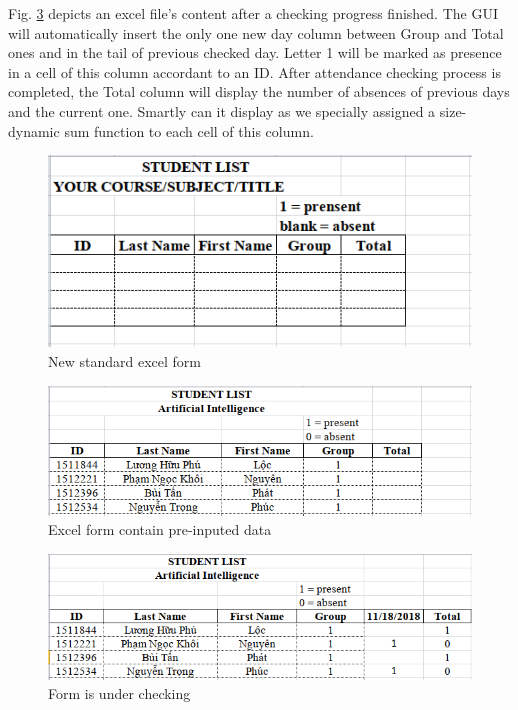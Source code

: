 \documentclass[journal, twocolumn]{IEEEtran}
\begin{document}
Fig. \ref{fig:form-checked} depicts an excel file's content after a checking progress finished. 
The GUI will automatically insert the only one new day column between Group and Total ones and in the tail of previous checked day. 
Letter 1 will be marked as presence in a cell of this column accordant to an ID. 
After attendance checking process is completed, the Total column will display the number of absences of previous days and the current one. Smartly can it display as we specially assigned a size-dynamic sum function to each cell of this column.


\begin{figure}
    \centering
    \includegraphics[width=0.8\linewidth]{img/form-new.png}
	\caption{New standard excel form}\label{fig:form-new}
\end{figure}

\begin{figure}
    \centering
    \includegraphics[width=0.8\linewidth]{img/form-data.png}
	\caption{Excel form contain pre-inputed data}\label{fig:form-data}
\end{figure}

\begin{figure}
    \centering
    \includegraphics[width=0.8\linewidth]{img/form-checked.png}
	\caption{Form is under checking}\label{fig:form-checked}
\end{figure}
\end{document}
